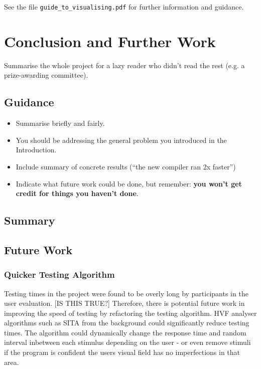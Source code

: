 \documentclass{l4proj}
\begin{document}
See the file \texttt{guide\_to\_visualising.pdf} for further information and guidance.



\chapter{Conclusion and Further Work}    
Summarise the whole project for a lazy reader who didn't read the rest (e.g. a prize-awarding committee).
\section{Guidance}
\begin{itemize}
    \item
        Summarise briefly and fairly.
    \item
        You should be addressing the general problem you introduced in the
        Introduction.        
    \item
        Include summary of concrete results (``the new compiler ran 2x
        faster'')
    \item
        Indicate what future work could be done, but remember: \textbf{you
        won't get credit for things you haven't done}.
\end{itemize}
\section{Summary}
\section{Future Work}
\subsection{Quicker Testing Algorithm}
Testing times in the project were found to be overly long by participants in the user evaluation. [IS THIS TRUE?] Therefore, there is potential future work in improving the speed of testing by refactoring the testing algorithm. HVF analyser algorithms such as SITA from the background could significantly reduce testing times. The algorithm could dynamically change the response time and random interval inbetween each stimulus depending on the user - or even remove stimuli if the program is confident the users visual field has no imperfections in that area.
\end{document}
